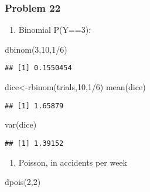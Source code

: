 \documentclass[
]{article}
\newenvironment{Shaded}{\begin{snugshade}}{\end{snugshade}}
\newcommand{\DecValTok}[1]{\textcolor[rgb]{0.00,0.00,0.81}{#1}}
\newcommand{\FunctionTok}[1]{\textcolor[rgb]{0.00,0.00,0.00}{#1}}
\newcommand{\NormalTok}[1]{#1}
\newcommand{\OtherTok}[1]{\textcolor[rgb]{0.56,0.35,0.01}{#1}}
\newcommand{\SpecialCharTok}[1]{\textcolor[rgb]{0.00,0.00,0.00}{#1}}
\providecommand{\tightlist}{%
  \setlength{\itemsep}{0pt}\setlength{\parskip}{0pt}}
\begin{document}
\hypertarget{problem-22}{%
\subsubsection{Problem 22}\label{problem-22}}

\begin{enumerate}
\def\labelenumi{\alph{enumi}.}
\tightlist
\item
  Binomial P(Y==3):
\end{enumerate}

\begin{Shaded}
\begin{Highlighting}[]
\FunctionTok{dbinom}\NormalTok{(}\DecValTok{3}\NormalTok{,}\DecValTok{10}\NormalTok{,}\DecValTok{1}\SpecialCharTok{/}\DecValTok{6}\NormalTok{)}
\end{Highlighting}
\end{Shaded}

\begin{verbatim}
## [1] 0.1550454
\end{verbatim}

\begin{Shaded}
\begin{Highlighting}[]
\NormalTok{dice}\OtherTok{\textless{}{-}}\FunctionTok{rbinom}\NormalTok{(trials,}\DecValTok{10}\NormalTok{,}\DecValTok{1}\SpecialCharTok{/}\DecValTok{6}\NormalTok{)}
\FunctionTok{mean}\NormalTok{(dice)}
\end{Highlighting}
\end{Shaded}

\begin{verbatim}
## [1] 1.65879
\end{verbatim}

\begin{Shaded}
\begin{Highlighting}[]
\FunctionTok{var}\NormalTok{(dice)}
\end{Highlighting}
\end{Shaded}

\begin{verbatim}
## [1] 1.39152
\end{verbatim}

\begin{enumerate}
\def\labelenumi{\alph{enumi}.}
\setcounter{enumi}{1}
\tightlist
\item
  Poisson, in accidents per week
\end{enumerate}

\begin{Shaded}
\begin{Highlighting}[]
\FunctionTok{dpois}\NormalTok{(}\DecValTok{2}\NormalTok{,}\DecValTok{2}\NormalTok{)}
\end{Highlighting}
\end{Shaded}
\end{document}
